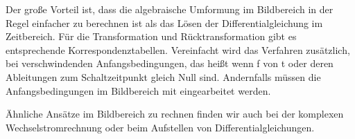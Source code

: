 \begin{frame}
{Der große Vorteil ist, dass die algebraische Umformung im Bildbereich in der Regel einfacher zu berechnen ist als das Lösen der Differentialgleichung im Zeitbereich. 
Für die Transformation und Rücktransformation gibt es entsprechende Korrespondenztabellen.
Vereinfacht wird das Verfahren zusätzlich, bei verschwindenden Anfangsbedingungen, das heißt wenn f von t oder deren Ableitungen zum Schaltzeitpunkt gleich Null sind.
Andernfalls müssen die Anfangsbedingungen im Bildbereich mit eingearbeitet werden. 

Ähnliche Ansätze im Bildbereich zu rechnen finden wir auch bei der komplexen Wechselstromrechnung oder beim Aufstellen von Differentialgleichungen.
}%
\end{frame}


